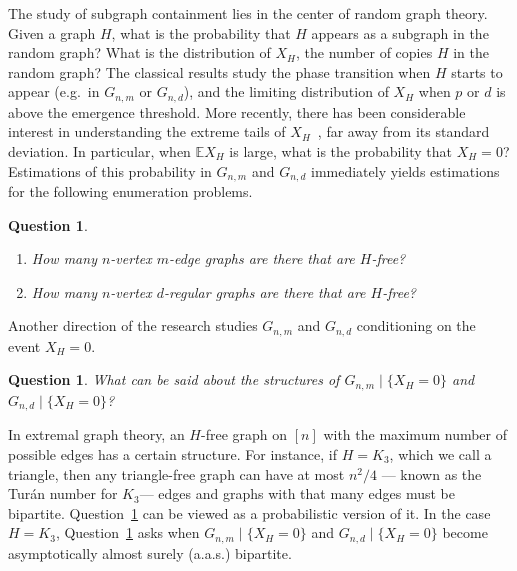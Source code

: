 \documentclass[11pt]{article}
\theoremstyle{plain}
\newtheorem{que}[thm]{Question}
\begin{document}
The study of subgraph containment lies in the center of random graph theory. Given a graph $H$, what is the probability that $H$ appears as a subgraph in the random graph? What is the distribution of $X_H$, the number of copies $H$ in the random graph? The classical results study the phase transition when $H$ starts to appear (e.g.\ in $G_{n,m}$ or $G_{n,d}$), and the limiting distribution of $X_H$ when $p$ or $d$ is above the emergence threshold. More recently, there has been considerable interest in understanding the extreme tails of  $X_H$~\cite{demarco2012,Dembo2018,  harel2022, JansonOleszkiewiczRucinski2004}, far away from its standard deviation. In particular, when $\mathbb{E} X_H$ is large, what is the probability that $X_H=0$? Estimations of this probability in $G_{n,m}$ and $G_{n,d}$ immediately yields estimations for the following enumeration problems.

\begin{que}
 \label{q:enumeration}   \begin{enumerate}
    \item[(a)]   How many $n$-vertex $m$-edge graphs are there that are $H$-free?
   
    \item[(b)] How many $n$-vertex $d$-regular graphs are there that are $H$-free?
   \end{enumerate}
\end{que}




Another direction of the research 
studies $G_{n,m}$ and $G_{n,d}$ conditioning on the event $X_H=0$.
\begin{que}\label{q:structure}
    What can be said about the structures of $G_{n,m}\mid \{X_H=0\}$ and $G_{n,d}\mid \{X_H=0\}$?
\end{que}

In extremal graph theory, an $H$-free graph on $[n]$ with the maximum number of possible edges has a certain structure. For instance, if $H=K_3$, which we call a triangle, then any triangle-free graph can have at most $n^2/4$ --- known as the Tur\'{a}n number for $K_3$--- edges and graphs with that many edges  must be  bipartite.
Question~\ref{q:structure} can be viewed as a probabilistic version of it. In the case $H=K_3$, Question~\ref{q:structure} asks when $G_{n,m}\mid \{X_H=0\}$ and $G_{n,d}\mid \{X_H=0\}$ become asymptotically almost surely (a.a.s.) bipartite.
\end{document}
